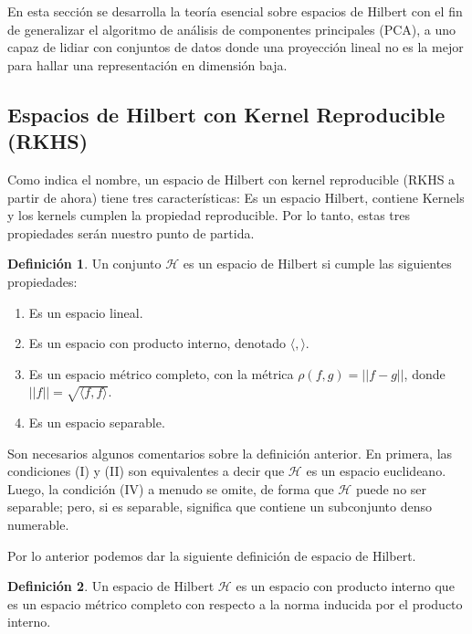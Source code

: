 \documentclass{article}
\numberwithin{equation}{section}
\theoremstyle{remark}
\theoremstyle{definition}
\newtheorem{definition}{Definición}
\theoremstyle{remark}
\theoremstyle{remark}
\begin{document}
En esta sección se desarrolla la
teoría esencial sobre espacios de Hilbert con el fin de generalizar el algoritmo de análisis de
componentes principales (PCA), a uno capaz de lidiar con conjuntos de datos donde una proyección lineal no es la mejor para 
hallar una representación en dimensión baja.

\subsection{Espacios de Hilbert con Kernel Reproducible (RKHS)}

Como indica el nombre, un espacio de Hilbert con kernel reproducible (RKHS a partir de ahora) tiene tres características: Es un espacio Hilbert, 
contiene Kernels y los kernels cumplen la propiedad reproducible. Por lo tanto, estas tres propiedades serán nuestro punto de partida.

\begin{definition}
Un conjunto $\mathcal{H}$ es un espacio de Hilbert si cumple las siguientes propiedades:

\begin{enumerate}[I]
    \item Es un espacio lineal.
    \item Es un espacio con producto interno, denotado $\langle,\rangle$.
    \item Es un espacio métrico completo, con la métrica $\rho(f, g) = ||f - g||$, donde $||f|| = \sqrt{\langle f, f\rangle}$.
    \item Es un espacio separable.
\end{enumerate}

\end{definition}
Son necesarios algunos comentarios sobre la definición anterior. En primera, las condiciones (I) y (II) 
son equivalentes a decir que $\mathcal{H}$ es un espacio euclideano.
Luego, la condición (IV) a menudo se omite, de forma que $\mathcal{H}$ puede no ser separable; 
pero, si es separable, significa que contiene un subconjunto denso numerable.

Por lo anterior podemos dar la siguiente definición de espacio de Hilbert.

\begin{definition}
    \label{df:hilbert_space}
    Un espacio de Hilbert $\mathcal{H}$ es un espacio con producto interno que es un espacio
    métrico completo con respecto a la norma inducida por el producto interno.
\end{definition}
\end{document}
